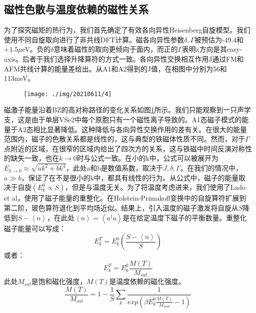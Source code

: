 \documentclass[reprint, aps, prb, showkeys]{revtex4-2}
\begin{document}
\subsection{磁性色散与温度依赖的磁性关系}
为了探究磁矩的热行为，我们首先确定了有效各向异性Heisenberg自旋模型。我们使用不同自旋取向进行了非共线DFT计算。磁各向异性参数$\delta, \Gamma$被预估为-49.4和$+1.5 \mu$eV。负的$\delta$意味着磁性的取向更倾向于面内，而正的$\Gamma$表明x方向是其easy-axis。后者于我们选择升降算符的方式一致。各向异性交换相互作用J通过FM和AFM共线计算的能量差给出。从A1和A2得到的J值，在相图中分别为56和113meV。
\begin{figure}[t]
    \texttt{[image: ./img/20210611/4]}
    \caption{\label{fig:magmon} 
    }
\end{figure}
磁激子能量沿着BZ的高对称路径的变化关系如图\ref{fig:magmon}所示。我们只能观察到一只声学支，这是由于单层VSe2中每个原胞只有一个磁性离子导致的。A1态磁子模式的能量于A2态相比显著降低。这种降低与各向异性交换作用的差有关。在很大的能量范围内，磁子的色散关系都是线性的，这与典型的铁磁体性质不同。然而，对于$\Gamma$点附近的区域，在很窄的区域内给出了四次方的关系，这与铁磁中时间反演对称性的缺失一致，也在$k \rightarrow 0$时与公式一致。在小的k中，公式可以被展开为$E_{k \rightarrow 0} \approx \sqrt{ak^2 + bk^4}$，此处a和b是数值系数，取决于$J, \delta, \Gamma$。在我们的情况中，$a \gg b$，保证了在不是很小的k中，都具有线性的行为。从公式中，磁子的能量取决于自旋$(E_k^0 \propto S)$，但是与温度无关。为了将温度考虑进来，我们使用了Lado et al，使用了磁子能量的重整化。在Holstein-Primakoff变换中的自旋算符扩展到第二阶，玻色算符退化到平均场近似。结果上，引入温度的磁子激发将自旋从$S$降低到$S - \left\langle n \right\rangle$，在此处$\left\langle n \right\rangle = \left\langle a^{\dagger} a \right\rangle$是在给定温度下磁子的平衡数量。重整化磁子能量可以写成：
\begin{equation}
    E_k^T = E_k^0 \left( \frac{S - \left\langle n \right\rangle}{S} \right)
\end{equation}
或者：
\begin{equation}
    E_k^T = E_k^0 \frac{M(T)}{M_{sat}}
\end{equation}
此处$M_{sat}$是饱和磁化强度，$M(T)$是温度依赖的磁化强度。
\begin{equation}
    \frac{M(T)}{M_{sat}} = 1 - \frac{1}{S} \sum_k \frac{1}{exp \left( \beta E_k^0 \frac{M(T)}{M_{mat}} - 1 \right)}
\end{equation}
\end{document}
